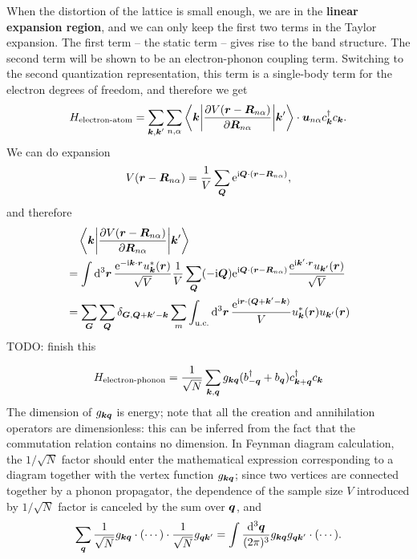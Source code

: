 \documentclass[hyperref, a4paper]{article}
\newcommand*{\ii}{\mathrm{i}}
\newcommand*{\ee}{\mathrm{e}}
\newcommand*{\concept}[1]{{\textbf{#1}}}
\begin{document}
When the distortion of the lattice is small enough, 
we are in the \concept{linear expansion region}, 
and we can only keep the first two terms in the Taylor expansion.
The first term -- the static term -- 
gives rise to the band structure. 
The second term will be shown to be an electron-phonon coupling term.
Switching to the second quantization representation, 
this term is a single-body term for the electron degrees of freedom, 
and therefore we get 
\begin{equation}
    H_{\text{electron-atom}} = 
    \sum_{\vb*{k}, \vb*{k}'} \sum_{n, \alpha}
    \mel**{\vb*{k}}{\pdv{V(\vb*{r} - \vb*{R}_{n \alpha})}{\vb*{R}_{n \alpha}}}{\vb*{k}'} 
    \cdot \vb*{u}_{n \alpha} c^\dagger_{\vb*{k}} c_{\vb*{k}}.
\end{equation}
We can do expansion 
\begin{equation}
    V(\vb*{r} - \vb*{R}_{n \alpha}) 
    = \frac{1}{V} \sum_{\vb*{Q}} \ee^{\ii \vb*{Q} \cdot (\vb*{r} - \vb*{R}_{n \alpha})},
\end{equation}
and therefore 
\[
    \begin{aligned}
        &\quad \mel**{\vb*{k}}{\pdv{V(\vb*{r} - \vb*{R}_{n \alpha})}{\vb*{R}_{n \alpha}}}{\vb*{k}'} \\
        &= 
        \int\dd[3]{\vb*{r}} \frac{\ee^{- \ii \vb*{k} \cdot \vb*{r}} u^*_{\vb*{k}}(\vb*{r})}{\sqrt{V}} 
        \frac{1}{V} \sum_{\vb*{Q}}  (- \ii \vb*{Q} ) \ee^{\ii \vb*{Q} \cdot (\vb*{r} - \vb*{R}_{n \alpha})}
        \frac{\ee^{\ii \vb*{k}' \cdot \vb*{r}} u_{\vb*{k}'}(\vb*{r})}{\sqrt{V}} \\
        &= \sum_{\vb*{G}} \sum_{\vb*{Q}} \delta_{\vb*{G}, \vb*{Q} + \vb*{k}' - \vb*{k}}
        \sum_m \int_{\text{u.c.}} \dd[3]{\vb*{r}} 
        \frac{\ee^{\ii \vb*{r} \cdot (\vb*{Q} + \vb*{k}' - \vb*{k})}}{V} 
        u_{\vb*{k}}^* (\vb*{r}) u_{\vb*{k}'}(\vb*{r}) 
    \end{aligned}
\]
TODO: finish this 

\begin{equation}
    H_{\text{electron-phonon}} = \frac{1}{\sqrt{N}} \sum_{\vb*{k}, \vb*{q}}
    g_{\vb*{k} \vb*{q}} (b^\dagger_{- \vb*{q}} + b_{\vb*{q}}) c^\dagger_{\vb*{k} + \vb*{q}} c_{\vb*{k}}
\end{equation}
The dimension of $g_{\vb*{k} \vb*{q}}$ is energy; 
note that all the creation and annihilation operators
are dimensionless: 
this can be inferred from the fact that the commutation relation contains no dimension.
In Feynman diagram calculation, 
the $1 / \sqrt{N}$ factor should enter 
the mathematical expression corresponding to a diagram 
together with the vertex function $g_{\vb*{k} \vb*{q}}$;
since two vertices are connected together by a phonon propagator, 
the dependence of the sample size $V$
introduced by $1 / \sqrt{N}$ factor is canceled by 
the sum over $\vb*{q}$, 
and 
\[
    \sum_{\vb*{q}} \frac{1}{\sqrt{N}} g_{\vb*{k} \vb*{q}} \cdot (\cdots) \cdot \frac{1}{\sqrt{N}} g_{\vb*{q} \vb*{k}'} = \int \frac{\dd[3]{\vb*{q}}}{(2\pi)^3} g_{\vb*{k} \vb*{q}} g_{\vb*{q} \vb*{k}'} \cdot (\cdots).
\]
\end{document}
